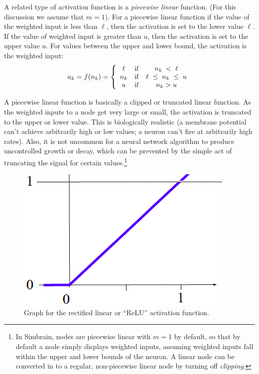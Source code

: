 A related type of activation function is a \emph{piecewise linear} function. (For this discussion we assume that $m=1$). For a piecewise linear function if the  value of the weighted input is less than $\ell$, then the activation is set to the lower value $\ell$. If the value of weighted input is greater than $u$, then the activation is set to the upper value $u$. For values between the upper and lower bound, the activation is the weighted input:
\begin{eqnarray*}
a_k = f(n_k) =  
\left\{
      \begin{array}{clc}
                  \ell      & {\rm if} &   n_k\; < \; \ell             \\
              n_k  & {\rm if} &  \ell \;\leq\; n_k \;\leq\; u \\
               u     & {\rm if} &    n_k > u
      \end{array} 
\right.
\end{eqnarray*}

A piecewise linear function is basically a clipped or truncated linear function. As the weighted inputs to a node get very large or small, the activation is truncated to the upper or lower value. This is biologically realistic (a membrane potential can't achieve arbitrarily high or low values; a neuron can't fire at arbitrarily high rates). Also, it is not uncommon for a neural network algorithm to produce uncontrolled growth or decay, which can be prevented by the simple act of truncating the signal for certain values.\footnote{In Simbrain, nodes are piecewise linear with $m=1$ by default, so that by default a node simply displays weighted inputs, assuming weighted inputs fall within the upper and lower bounds of the neuron. A linear node can be converted in to a regular, non-piecewise linear node by turning off  \emph{clipping}.}

\begin{figure}[h]
\centering
\includegraphics[scale=.4]{./images/relu.png}
\caption[Scott Hotton.]{Graph for the rectified linear or ``ReLU'' activation function.}
\label{relu}
\end{figure}

